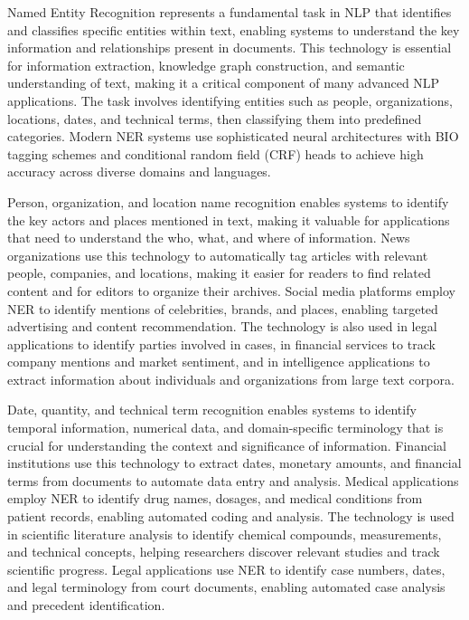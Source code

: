 Named Entity Recognition represents a fundamental task in NLP that identifies and classifies specific entities within text, enabling systems to understand the key information and relationships present in documents. This technology is essential for information extraction, knowledge graph construction, and semantic understanding of text, making it a critical component of many advanced NLP applications. The task involves identifying entities such as people, organizations, locations, dates, and technical terms, then classifying them into predefined categories. Modern NER systems use sophisticated neural architectures with BIO tagging schemes and conditional random field (CRF) heads to achieve high accuracy across diverse domains and languages.

Person, organization, and location name recognition enables systems to identify the key actors and places mentioned in text, making it valuable for applications that need to understand the who, what, and where of information. News organizations use this technology to automatically tag articles with relevant people, companies, and locations, making it easier for readers to find related content and for editors to organize their archives. Social media platforms employ NER to identify mentions of celebrities, brands, and places, enabling targeted advertising and content recommendation. The technology is also used in legal applications to identify parties involved in cases, in financial services to track company mentions and market sentiment, and in intelligence applications to extract information about individuals and organizations from large text corpora.

Date, quantity, and technical term recognition enables systems to identify temporal information, numerical data, and domain-specific terminology that is crucial for understanding the context and significance of information. Financial institutions use this technology to extract dates, monetary amounts, and financial terms from documents to automate data entry and analysis. Medical applications employ NER to identify drug names, dosages, and medical conditions from patient records, enabling automated coding and analysis. The technology is used in scientific literature analysis to identify chemical compounds, measurements, and technical concepts, helping researchers discover relevant studies and track scientific progress. Legal applications use NER to identify case numbers, dates, and legal terminology from court documents, enabling automated case analysis and precedent identification.

